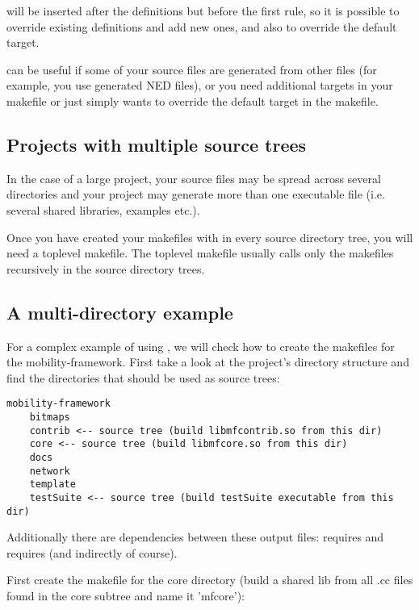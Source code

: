  will be inserted after the definitions but before the first
rule, so it is possible to override existing definitions and add new
ones, and also to override the default target.

 can be useful if some of your source files are generated
from other files (for example, you use generated NED files), or you need
additional targets in your makefile or just simply wants to override the
default target in the makefile.


\subsection{Projects with multiple source trees}

In the case of a large project, your source files may be spread across
several directories and your project may generate more than one executable
file (i.e. several shared libraries, examples etc.).

Once you have created your makefiles with  in
every source directory tree, you will need a toplevel makefile.
The toplevel makefile usually calls only the makefiles
recursively in the source directory trees.


\subsection{A multi-directory example}

For a complex example of using , we will check how to create
the makefiles for the mobility-framework. First take a look at the
project's directory structure and find the directories that should be used as
source trees:

\begin{verbatim}
mobility-framework
    bitmaps
    contrib <-- source tree (build libmfcontrib.so from this dir)
    core <-- source tree (build libmfcore.so from this dir)
    docs
    network
    template
    testSuite <-- source tree (build testSuite executable from this dir)
\end{verbatim}

Additionally there are dependencies between these output files: 
requires  and  requires  (and indirectly
 of course).

First create the makefile for the core directory (build a shared lib from all .cc files
found in the core subtree and name it 'mfcore'):

